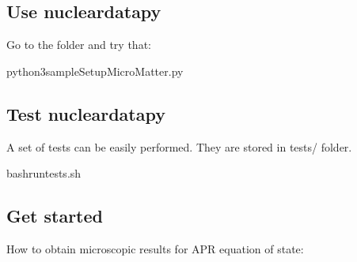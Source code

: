 \documentclass[letterpaper,10pt,english]{sphinxmanual}
\begin{document}
\subsection{Use nucleardatapy}
\label{\detokenize{source/usage:use-nucleardatapy}}\label{\detokenize{source/usage:use}}
\sphinxAtStartPar
Go to the folder  and try that:

\begin{sphinxVerbatim}[commandchars=\\\{\}]
python3sample\PYGZus{}SetupMicroMatter.py
\end{sphinxVerbatim}


\subsection{Test nucleardatapy}
\label{\detokenize{source/usage:test-nucleardatapy}}\label{\detokenize{source/usage:test}}
\sphinxAtStartPar
A set of tests can be easily performed. They are stored in tests/ folder.

\begin{sphinxVerbatim}[commandchars=\\\{\}]
bashrun\PYGZus{}tests.sh
\end{sphinxVerbatim}


\subsection{Get started}
\label{\detokenize{source/usage:get-started}}\label{\detokenize{source/usage:id2}}
\sphinxAtStartPar
How to obtain microscopic results for APR equation of state:

\begin{sphinxVerbatim}[commandchars=\\\{\}]
 
  
 

   

      

 
\end{sphinxVerbatim}
\end{document}
